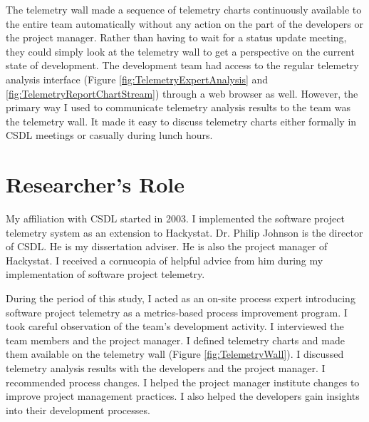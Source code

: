 The telemetry wall made a sequence of telemetry charts continuously available to the entire team automatically without any action on the part of the developers or the project manager. Rather than having to wait for a status update meeting, they could simply look at the telemetry wall to get a perspective on the current state of development. The development team had access to the regular telemetry analysis interface (Figure \ref{fig:TelemetryExpertAnalysis} and   \ref{fig:TelemetryReportChartStream}) through a web browser as well. However, the primary way I used to communicate telemetry analysis results to the team was the telemetry wall. It made it easy to discuss telemetry charts either formally in CSDL meetings or casually during lunch hours. 









\section{Researcher's Role}  \label{EvaluationInCSDL:Role}

My affiliation with CSDL started in 2003. I implemented the software project telemetry system as an extension to Hackystat. Dr. Philip Johnson is the director of CSDL. He is my dissertation adviser. He is also the project manager of Hackystat. I received a cornucopia of helpful advice from him during my implementation of software project telemetry.

During the period of this study, I acted as an on-site process expert introducing software project telemetry as a metrics-based process improvement program. I took careful observation of the team's development activity. I interviewed the team members and the project manager. I defined telemetry charts and made them available on the telemetry wall (Figure \ref{fig:TelemetryWall}). I discussed telemetry analysis results with the developers and the project manager. I recommended process changes. I helped the project manager institute changes to improve project management practices. I also helped the developers gain insights into their development processes.

